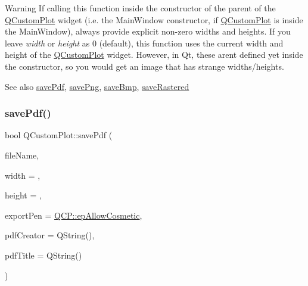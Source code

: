 \begin{DoxyWarning}{Warning}
If calling this function inside the constructor of the parent of the \hyperlink{class_q_custom_plot}{Q\+Custom\+Plot} widget (i.\+e. the Main\+Window constructor, if \hyperlink{class_q_custom_plot}{Q\+Custom\+Plot} is inside the Main\+Window), always provide explicit non-\/zero widths and heights. If you leave {\itshape width} or {\itshape height} as 0 (default), this function uses the current width and height of the \hyperlink{class_q_custom_plot}{Q\+Custom\+Plot} widget. However, in Qt, these aren\textquotesingle{}t defined yet inside the constructor, so you would get an image that has strange widths/heights.
\end{DoxyWarning}
\begin{DoxySeeAlso}{See also}
\hyperlink{class_q_custom_plot_ad5acd34f6b39c3516887d7e54fec2412}{save\+Pdf}, \hyperlink{class_q_custom_plot_ac92cc9256d12f354b40a4be4600b5fb9}{save\+Png}, \hyperlink{class_q_custom_plot_ae3a86ed0795670e50afa21759d4fa13d}{save\+Bmp}, \hyperlink{class_q_custom_plot_ad7723ce2edfa270632ef42b03a444352}{save\+Rastered} 
\end{DoxySeeAlso}
\mbox{\label{class_q_custom_plot_ad5acd34f6b39c3516887d7e54fec2412}} 
\subsubsection{\texorpdfstring{save\+Pdf()}{savePdf()}}
{\footnotesize\ttfamily bool Q\+Custom\+Plot\+::save\+Pdf (\begin{DoxyParamCaption}\item[{const Q\+String \&}]{file\+Name,  }\item[{int}]{width = {},  }\item[{int}]{height = {},  }\item[{\hyperlink{namespace_q_c_p_a17844f19e1019693a953e1eb93536d2f}{Q\+C\+P\+::\+Export\+Pen}}]{export\+Pen = {\ttfamily \hyperlink{namespace_q_c_p_a17844f19e1019693a953e1eb93536d2fa34716c7388ad3a2ff3ac27e57fb83a5b}{Q\+C\+P\+::ep\+Allow\+Cosmetic}},  }\item[{const Q\+String \&}]{pdf\+Creator = {\ttfamily QString()},  }\item[{const Q\+String \&}]{pdf\+Title = {\ttfamily QString()} }\end{DoxyParamCaption})}

